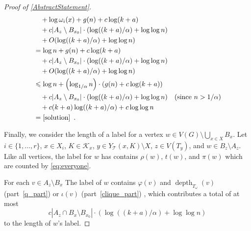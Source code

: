 \documentclass{patmorin}
\DeclareMathOperator{\depth}{depth}
\renewcommand{\le}{\leqslant}
\let\eqref\cref
\begin{document}
\begin{proof}[Proof of \cref{AbstractStatement}]
\begin{align*}
       & \quad {} + \log\omega_i(x) + g(n) + c\log(k+a) \\
       & \quad {}+ c|A_z\setminus B_{x_0}|\cdot (\log((k+a)/\alpha) + \log\log n) \\
       & \quad {}+ O(\log((k+a)/\alpha)+\log\log n) \\
       & =
       \log n + g(n) + c\log(k+a) \\
       & \quad {}+ c|A_z\setminus B_{x_0}|\cdot (\log((k+a)/\alpha) + \log\log n) \\
       & \quad {}+ O(\log((k+a)/\alpha)+\log\log n) \\
       & \le
       \log n + \left(\log_{1/\alpha} n\right)\cdot (g(n) + c\log(k+a)) \\
       & \quad {}+ c|A_z\setminus B_{x_0}|\cdot (\log((k+a)/\alpha) + \log\log n) & \text{(since $n> 1/\alpha$)} \\
       & \quad {}+ c(k+a)\log((k+a)/\alpha) + c\log\log n \\
       & = \eqref{solution} \enspace .
    \end{align*}

    Finally, we consider the length of a label for a vertex $w\in V(G)\setminus\bigcup_{x\in X}B_x$.  Let $i\in\{1,\ldots,r\}$,
    $x\in X_i$, $K\in\mathcal{K}_x$, $y\in Y_{\mathcal{T}}(x,K)\setminus X$, $z\in V(T_y)$, and $w\in B_z\setminus A_z$.  Like all vertices, the label for $w$ has contains $\rho(w)$, $t(w)$, and $\pi(w)$ which are counted by \eqref{eq:everyone}.

    For each $v\in A_z\setminus B_{x}$
    The label of $w$ contains $\varphi(v)$ and $\depth_{T_\omega}(v)$ (part~\ref{q_part}) or $\iota(v)$ (part~\ref{clique_part}) , which contributes a total of at most
    \begin{equation}
        c|A_z\cap B_x\setminus B_{x_0}|\cdot(\log((k+a)/\alpha)+\log\log n)
    \end{equation}
    to the length of $w$'s label.


\end{proof}
\end{document}

